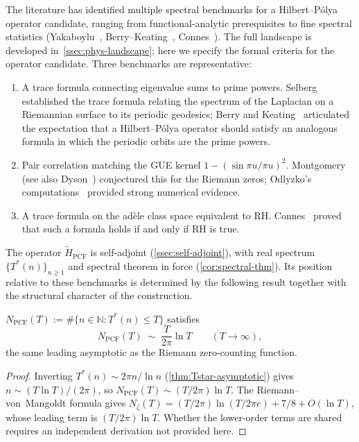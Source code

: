 The literature has identified multiple spectral benchmarks for a
Hilbert--P\'olya operator candidate, ranging from functional-analytic
prerequisites to fine spectral statistics
(Yakaboylu~\cite{yakaboylu24}, Berry--Keating~\cite{berry99},
Connes~\cite{connes99}).  The full landscape is developed
in~\cref{ssec:phys-landscape}; here we specify the formal criteria
for the operator candidate.  Three benchmarks are representative:
\begin{enumerate}
\item[\emph{(i)}]
  A trace formula connecting eigenvalue sums to prime powers.
  Selberg~\cite{hejhal1976selberg} established the trace formula relating the
  spectrum of the Laplacian on a Riemannian surface to its periodic
  geodesics; Berry and Keating~\cite{berry99} articulated the
  expectation that a Hilbert--P\'olya operator should satisfy an
  analogous formula in which the periodic orbits are the prime powers.
\item[\emph{(ii)}]
  Pair correlation matching the GUE kernel
  $1-(\sin\pi u/\pi u)^2$.  Montgomery~\cite{montgomery73} (see also Dyson~\cite{dyson62}) conjectured
  this for the Riemann zeros; Odlyzko's computations~\cite{odlyzko01}
  provided strong numerical evidence.
\item[\emph{(iii)}]
  A trace formula on the ad\`ele class space equivalent to RH.
  Connes~\cite{connes99} proved that such a formula holds if and only
  if RH is true.
\end{enumerate}

The operator $\tilde{H}_{\mathrm{PCF}}$ is self-adjoint
(\cref{ssec:self-adjoint}), with real spectrum
$\{T^*(n)\}_{n\ge 1}$ and spectral theorem in force
(\cref{cor:spectral-thm}).  Its position relative to
these benchmarks is determined by the following result together
with the structural character of the construction.

\begin{Proposition}\label{prop:density}
$N_{\mathrm{PCF}}(T) := \#\{n\in\mathbb{N} : T^*(n)\le T\}$ satisfies
\begin{equation}\label{eq:density}
  N_{\mathrm{PCF}}(T) \;\sim\; \frac{T}{2\pi}\ln T
  \qquad (T\to\infty),
\end{equation}
the same leading asymptotic as the Riemann zero-counting function.
\end{Proposition}

\begin{proof}
Inverting $T^*(n)\sim 2\pi n/\ln n$
(\cref{thm:Tstar-asymptotic}) gives
$n\sim (T\ln T)/(2\pi)$, so
$N_{\mathrm{PCF}}(T)\sim (T/2\pi)\ln T$.  The Riemann--von~Mangoldt
formula gives
$N_\zeta(T) = (T/2\pi)\ln(T/2\pi e) + 7/8 + O(\ln T)$,
whose leading term is $(T/2\pi)\ln T$.  Whether the lower-order
terms are shared requires an independent derivation not provided
here.
\end{proof}

